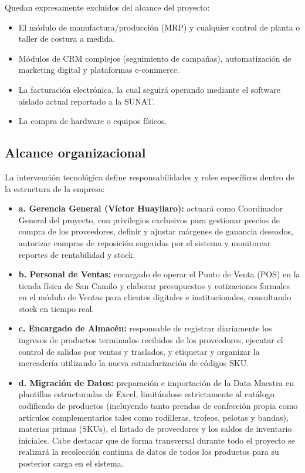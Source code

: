 \begin{indentedsubsection}
Quedan expresamente excluidos del alcance del proyecto:
\begin{itemize}
    \item El módulo de manufactura/producción (MRP) y cualquier control de planta o taller de costura a medida.
    \item Módulos de CRM complejos (seguimiento de campañas), automatización de marketing digital y plataformas e-commerce.
    \item La facturación electrónica, la cual seguirá operando mediante el software aislado actual reportado a la SUNAT.
    \item La compra de hardware o equipos físicos.
\end{itemize}
\end{indentedsubsection}

\subsection{Alcance organizacional}
\begin{indentedsubsection}
La intervención tecnológica define responsabilidades y roles específicos dentro de la estructura de la empresa:

\begin{itemize}
    \item \textbf{a. Gerencia General (Víctor Huayllaro):} actuará como Coordinador General del proyecto, con privilegios exclusivos para gestionar precios de compra de los proveedores, definir y ajustar márgenes de ganancia deseados, autorizar compras de reposición sugeridas por el sistema y monitorear reportes de rentabilidad y stock.
    \item \textbf{b. Personal de Ventas:} encargado de operar el Punto de Venta (POS) en la tienda física de San Camilo y elaborar presupuestos y cotizaciones formales en el módulo de Ventas para clientes digitales e institucionales, consultando stock en tiempo real.
    \item \textbf{c. Encargado de Almacén:} responsable de registrar diariamente los ingresos de productos terminados recibidos de los proveedores, ejecutar el control de salidas por ventas y traslados, y etiquetar y organizar la mercadería utilizando la nueva estandarización de códigos SKU.
    \item \textbf{d. Migración de Datos:} preparación e importación de la Data Maestra en plantillas estructuradas de Excel, limitándose estrictamente al catálogo codificado de productos (incluyendo tanto prendas de confección propia como artículos complementarios tales como rodilleras, trofeos, pelotas y bandas), materias primas (SKUs), el listado de proveedores y los saldos de inventario iniciales. Cabe destacar que de forma transversal durante todo el proyecto se realizará la recolección continua de datos de todos los productos para su posterior carga en el sistema.
\end{itemize}
\end{indentedsubsection}

